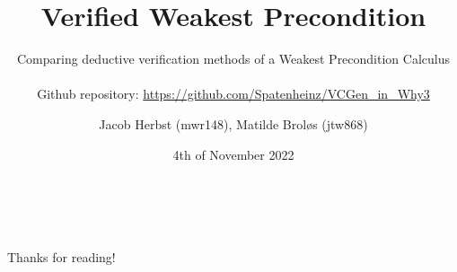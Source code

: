 \documentclass[a4paper]{article}
\title{\textbf{Verified Weakest Precondition}}
\subtitle{Comparing deductive verification methods of a Weakest Precondition Calculus\\~\\
\small{Github repository: \url{https://github.com/Spatenheinz/VCGen_in_Why3}} }
\author{Jacob Herbst (mwr148), Matilde Broløs (jtw868)} \date{4th of November 2022} \advisor{Advisor: Ken Friis Larsen}
\begin{document}
\maketitle

\tableofcontents

\newpage












\\~\\
Thanks for reading!

\newpage
\printbibliography
\newpage
\appendix


\newpage

\end{document}
